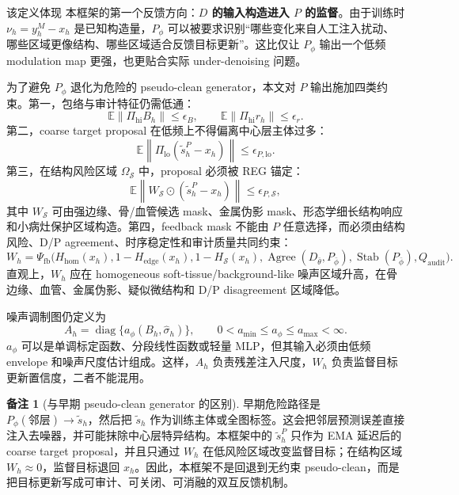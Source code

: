 \documentclass[11pt,a4paper,UTF8,fontset=fandol]{ctexart}
\theoremstyle{definition}
\newtheorem{remark}[theorem]{备注}
\DeclareMathOperator{\diag}{diag}
\DeclareMathOperator{\Agree}{Agree}
\DeclareMathOperator{\Stab}{Stab}
\newcommand{\norm}[1]{\left\lVert#1\right\rVert}
\newcommand{\E}{\mathbb{E}}
\begin{document}
该定义体现 本框架的第一个反馈方向：\textbf{$D$ 的输入构造进入 $P$ 的监督}。由于训练时 $\nu_h=y_h^M-x_h$ 是已知构造量，$P_\phi$ 可以被要求识别“哪些变化来自人工注入扰动、哪些区域更像结构、哪些区域适合反馈目标更新”。这比仅让 $P_\phi$ 输出一个低频 modulation map 更强，也更贴合实际 under-denoising 问题。

为了避免 $P_\phi$ 退化为危险的 pseudo-clean generator，本文对 $P$ 输出施加四类约束。第一，包络与审计特征仍需低通：
\begin{equation}
\label{eq:envelope-hi-bound-coreB}
    \E\norm{\Pi_{\mathrm{hi}}B_h}\le\epsilon_B,
    \qquad
    \E\norm{\Pi_{\mathrm{hi}}r_h}\le\epsilon_r.
\end{equation}
第二，coarse target proposal 在低频上不得偏离中心层主体过多：
\begin{equation}
\label{eq:p-lowfreq-anchor-coreB}
    \E\norm{\Pi_{\mathrm{lo}}(\tilde s_h^P-x_h)}\le\epsilon_{P,\mathrm{lo}}.
\end{equation}
第三，在结构风险区域 $\Omega_{\mathcal S}$ 中，proposal 必须被 REG 锚定：
\begin{equation}
\label{eq:p-structure-anchor-coreB}
    \E\norm{W_{\mathcal S}\odot(\tilde s_h^P-x_h)}\le\epsilon_{P,\mathcal S},
\end{equation}
其中 $W_{\mathcal S}$ 可由强边缘、骨/血管候选 mask、金属伪影 mask、形态学细长结构响应和小病灶保护区域构造。第四，feedback mask 不能由 $P$ 任意选择，而必须由结构风险、D/P agreement、时序稳定性和审计质量共同约束：
\begin{equation}
\label{eq:feedback-mask-coreB}
    W_h=\Psi_{\mathrm{fb}}\Big(
    H_{\mathrm{hom}}(x_h),
    1-H_{\mathrm{edge}}(x_h),
    1-H_{\mathcal S}(x_h),
    \Agree(D_{\bar\theta},P_{\bar\phi}),
    \Stab(P_{\bar\phi}),
    Q_{\mathrm{audit}}
    \Big).
\end{equation}
直观上，$W_h$ 应在 homogeneous soft-tissue/background-like 噪声区域升高，在骨边缘、血管、金属伪影、疑似微结构和 D/P disagreement 区域降低。

噪声调制图仍定义为
\begin{equation}
\label{eq:modulation-coreB}
    A_h=\diag\{a_\phi(B_h,\widehat\sigma_h)\},
    \qquad
    0<a_{\min}\le a_\phi\le a_{\max}<\infty.
\end{equation}
$a_\phi$ 可以是单调标定函数、分段线性函数或轻量 MLP，但其输入必须由低频 envelope 和噪声尺度估计组成。这样，$A_h$ 负责残差注入尺度，$W_h$ 负责监督目标更新置信度，二者不能混用。

\begin{remark}[与早期 pseudo-clean generator 的区别]
早期危险路径是 $P_\phi(\text{邻层})\to\tilde s_h$，然后把 $\tilde s_h$ 作为训练主体或全图标签。这会把邻层预测误差直接注入去噪器，并可能抹除中心层特异结构。本框架中的 $\tilde s_h^P$ 只作为 EMA 延迟后的 coarse target proposal，并且只通过 $W_h$ 在低风险区域改变监督目标；在结构区域 $W_h\approx0$，监督目标退回 $x_h$。因此，本框架不是回退到无约束 pseudo-clean，而是把目标更新写成可审计、可关闭、可消融的双互反馈机制。
\end{remark}
\end{document}
